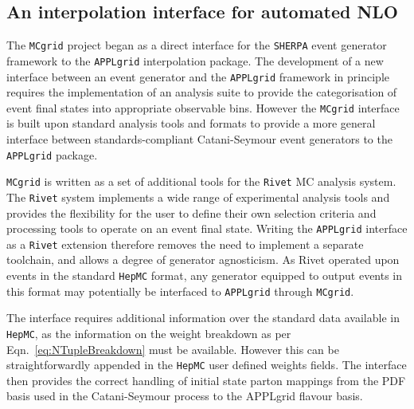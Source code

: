 \subsection{An interpolation interface for automated NLO} 
\label{sec:interp}
The {\tt MCgrid} project began as a direct interface for the {\tt SHERPA} event generator framework to the {\tt APPLgrid} interpolation package. The development of a new interface between an event generator and the {\tt APPLgrid} framework in principle requires the implementation of an analysis suite to provide the categorisation of event final states into appropriate observable bins. However the {\tt MCgrid} interface is built upon standard analysis tools and formats to provide a more general interface between standards-compliant Catani-Seymour event generators to the {\tt APPLgrid} package.

{\tt MCgrid} is written as a set of additional tools for the {\tt Rivet} MC analysis system. The {\tt Rivet} system implements a wide range of experimental analysis tools and provides the flexibility for the user to define their own selection criteria and processing tools to operate on an event final state. Writing the {\tt APPLgrid} interface as a {\tt Rivet} extension therefore removes the need to implement a separate toolchain, and allows a degree of generator agnosticism. As {\tt} Rivet operated upon events in the standard {\tt HepMC} format, any generator equipped to output events in this format may potentially be interfaced to {\tt APPLgrid} through {\tt MCgrid}.

The interface requires additional information over the standard data available in {\tt HepMC}, as the information on the weight breakdown as per Eqn.~\ref{eq:NTupleBreakdown} must be available. However this can be straightforwardly appended in the {\tt HepMC} user defined weights fields. The interface then provides the correct handling of initial state parton mappings from the PDF basis used in the Catani-Seymour process to the APPLgrid flavour basis.


